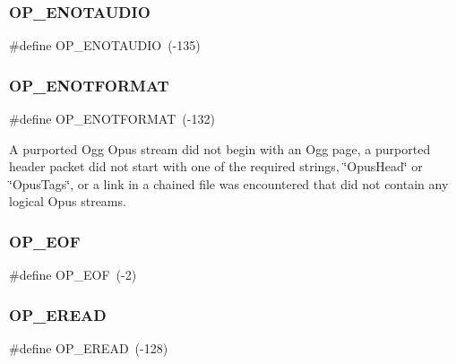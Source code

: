 \subsubsection{\texorpdfstring{O\+P\+\_\+\+E\+N\+O\+T\+A\+U\+D\+IO}{OP\_ENOTAUDIO}}
{\footnotesize\ttfamily \#define O\+P\+\_\+\+E\+N\+O\+T\+A\+U\+D\+IO~(-\/135)}

\mbox{\label{group__error__codes_gafca3ae244d24e10b2851c77379453220}} 
\subsubsection{\texorpdfstring{O\+P\+\_\+\+E\+N\+O\+T\+F\+O\+R\+M\+AT}{OP\_ENOTFORMAT}}
{\footnotesize\ttfamily \#define O\+P\+\_\+\+E\+N\+O\+T\+F\+O\+R\+M\+AT~(-\/132)}

A purported Ogg Opus stream did not begin with an Ogg page, a purported header packet did not start with one of the required strings, \char`\"{}\+Opus\+Head\char`\"{} or \char`\"{}\+Opus\+Tags\char`\"{}, or a link in a chained file was encountered that did not contain any logical Opus streams. \mbox{\label{group__error__codes_ga3fdffc8ee880969d99fc862d53c0efd2}} 
\subsubsection{\texorpdfstring{O\+P\+\_\+\+E\+OF}{OP\_EOF}}
{\footnotesize\ttfamily \#define O\+P\+\_\+\+E\+OF~(-\/2)}

\mbox{\label{group__error__codes_ga3ad48a4f99b1bed72acec552296dfc08}} 
\subsubsection{\texorpdfstring{O\+P\+\_\+\+E\+R\+E\+AD}{OP\_EREAD}}
{\footnotesize\ttfamily \#define O\+P\+\_\+\+E\+R\+E\+AD~(-\/128)}

